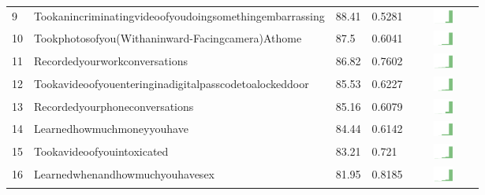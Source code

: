 \documentclass[a4paper,12pt]{article}
\begin{document}
\begin{longtable}{| p{0.5cm} | p{7cm} | p{1cm} |p{1cm} | c |}
9 & Tookanincriminatingvideoofyoudoingsomethingembarrassing & 88.41&0.5281 & \includegraphics[width = 2cm, height = 0.5cm]{tables/tookanincriminatingvideoofyoudoingsomethingembarrassingcombined} \\ 
10 & Tookphotosofyou(Withaninward-Facingcamera)Athome & 87.5&0.6041 & \includegraphics[width = 2cm, height = 0.5cm]{tables/tookphotosofyou(withaninward-facingcamera)athomecombined} \\ 
11 & Recordedyourworkconversations & 86.82&0.7602 & \includegraphics[width = 2cm, height = 0.5cm]{tables/recordedyourworkconversationscombined} \\ 
12 & Tookavideoofyouenteringinadigitalpasscodetoalockeddoor & 85.53&0.6227 & \includegraphics[width = 2cm, height = 0.5cm]{tables/tookavideoofyouenteringinadigitalpasscodetoalockeddoorcombined} \\ 
13 & Recordedyourphoneconversations & 85.16&0.6079 & \includegraphics[width = 2cm, height = 0.5cm]{tables/recordedyourphoneconversationscombined} \\ 
14 & Learnedhowmuchmoneyyouhave & 84.44&0.6142 & \includegraphics[width = 2cm, height = 0.5cm]{tables/learnedhowmuchmoneyyouhavecombined} \\ 
15 & Tookavideoofyouintoxicated & 83.21&0.721 & \includegraphics[width = 2cm, height = 0.5cm]{tables/tookavideoofyouintoxicatedcombined} \\ 
16 & Learnedwhenandhowmuchyouhavesex & 81.95&0.8185 & \includegraphics[width = 2cm, height = 0.5cm]{tables/learnedwhenandhowmuchyouhavesexcombined} \\ 

\end{longtable}
\end{document}
